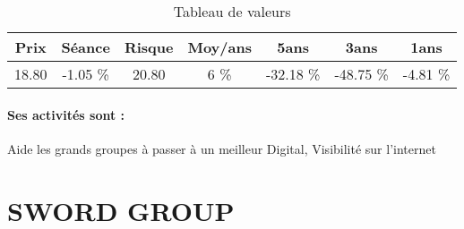 \documentclass[11pt,a4paper]{report}%
\begin{document}
\begin{table}[H]
  \centering
    \begin{tabular}{|c|c|c|c|c|c|c|}
    \hline
    Prix & Séance & Risque  & Moy/ans & 5ans & 3ans & 1ans \\
    \hline
    18.80 &    -1.05 \%    & 20.80 & 6 \% & -32.18 \% & -48.75 \% & -4.81 \% \\
    \hline
    \end{tabular}%
        \label{tab:table_SQLI}%
      \caption{Tableau de valeurs}
\end{table}%

\paragraph{Ses activités sont : } Aide les grands groupes à passer à un meilleur Digital, Visibilité sur l’internet 
    
    \newpage

\section{SWORD GROUP}
\end{document}
